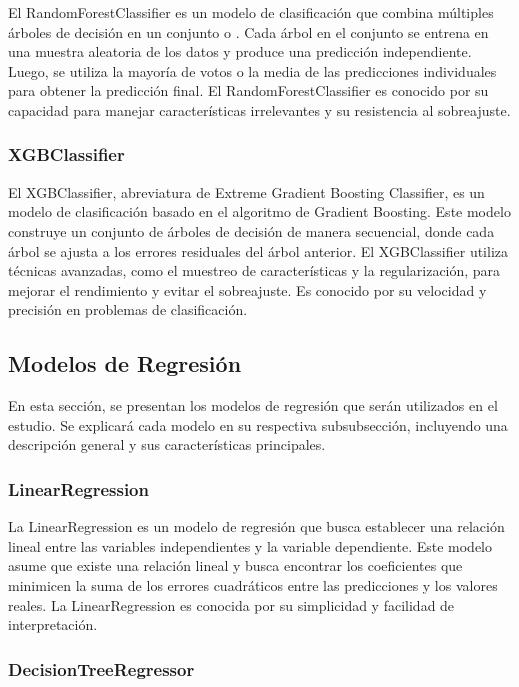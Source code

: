 El RandomForestClassifier es un modelo de clasificación que combina múltiples árboles de decisión en un conjunto o . Cada árbol en el conjunto se entrena en una muestra aleatoria de los datos y produce una predicción independiente. Luego, se utiliza la mayoría de votos o la media de las predicciones individuales para obtener la predicción final. El RandomForestClassifier es conocido por su capacidad para manejar características irrelevantes y su resistencia al sobreajuste.

\subsubsection{XGBClassifier}

El XGBClassifier, abreviatura de Extreme Gradient Boosting Classifier, es un modelo de clasificación basado en el algoritmo de Gradient Boosting. Este modelo construye un conjunto de árboles de decisión de manera secuencial, donde cada árbol se ajusta a los errores residuales del árbol anterior. El XGBClassifier utiliza técnicas avanzadas, como el muestreo de características y la regularización, para mejorar el rendimiento y evitar el sobreajuste. Es conocido por su velocidad y precisión en problemas de clasificación.

\subsection{Modelos de Regresión}

En esta sección, se presentan los modelos de regresión que serán utilizados en el estudio. Se explicará cada modelo en su respectiva subsubsección, incluyendo una descripción general y sus características principales.

\subsubsection{LinearRegression}

La LinearRegression es un modelo de regresión que busca establecer una relación lineal entre las variables independientes y la variable dependiente. Este modelo asume que existe una relación lineal y busca encontrar los coeficientes que minimicen la suma de los errores cuadráticos entre las predicciones y los valores reales. La LinearRegression es conocida por su simplicidad y facilidad de interpretación.

\subsubsection{DecisionTreeRegressor}

